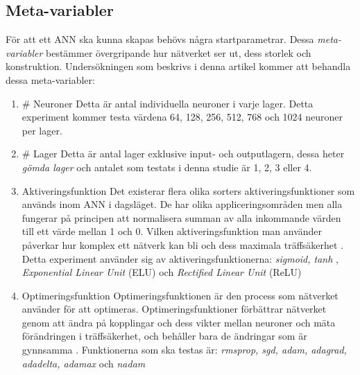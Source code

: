 \documentclass[a4paper, 12pt]{article}
\begin{document}
    \subsection{Meta-variabler}
    För att ett ANN ska kunna skapas behövs några startparametrar. Dessa \textit{meta-variabler} bestämmer övergripande hur nätverket ser ut, dess storlek och konstruktion. Undersökningen som beskrivs i denna artikel kommer att behandla dessa meta-variabler:
    \begin{enumerate}
        \item \# Neuroner
        \newline
        Detta är antal individuella neuroner i varje lager. Detta experiment kommer testa värdena 64, 128, 256, 512, 768 och 1024 neuroner per lager.
        \item \# Lager
        \newline
        Detta är antal lager exklusive input- och outputlagern, dessa heter \textit{gömda lager} och antalet som testats i denna studie är 1, 2, 3 eller 4.
        \item Aktiveringsfunktion
        \newline
        Det existerar flera olika sorters aktiveringsfunktioner som används inom ANN i dagsläget. De har olika appliceringsområden men alla fungerar på principen att normalisera summan av alla inkommande värden till ett värde mellan 1 och 0. Vilken aktiveringsfunktion man använder påverkar hur komplex ett nätverk kan bli och dess maximala träffsäkerhet \parencite{jain1996artificial}. Detta experiment använder sig av aktiveringsfunktionerna: \textit{sigmoid, tanh} \parencite{karlik2011performance}, \textit{Exponential Linear Unit} (ELU) \parencite{clevert2015fast} och \textit{Rectified Linear Unit} (ReLU) \parencite{xu2015empirical}
        \item Optimeringsfunktion
        \newline
        Optimeringsfunktionen är den process som nätverket använder för att optimeras. Optimeringsfunktioner förbättrar nätverket genom att ändra på kopplingar och dess vikter mellan neuroner och mäta förändringen i träffsäkerhet, och behåller bara de ändringar som är gynnsamma \parencite{TypesofO34:online}. Funktionerna som ska testas är: \textit{rmsprop, sgd, adam, adagrad, adadelta, adamax } och \textit{nadam} \parencite{kingma2014adam}
    \end{enumerate}
\end{document}
